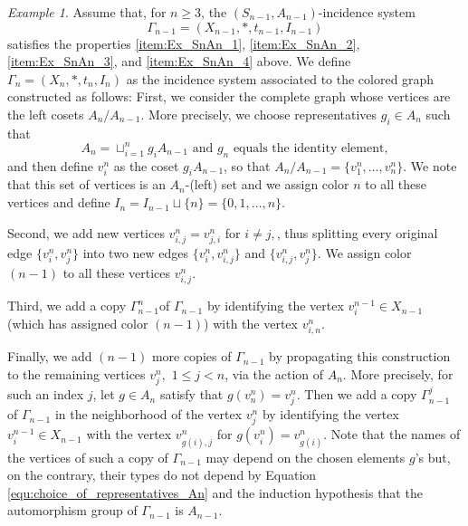 \documentclass{amsart}
\theoremstyle{definition}
\theoremstyle{remark}
\newtheorem{example}[theorem]{Example}
\begin{document}
\begin{example}
Assume that, for $n\geq 3$, the $(S_{n-1},A_{n-1})$-incidence system 
\[
\Gamma_{n-1}=(X_{n-1},*,t_{n-1},I_{n-1})
\]
satisfies the properties \ref{item:Ex_SnAn_1}, \ref{item:Ex_SnAn_2}, \ref{item:Ex_SnAn_3}, and \ref{item:Ex_SnAn_4} above. We define $\Gamma_n=(X_n,*,t_n,I_n)$ as the incidence system associated to the  colored graph constructed as follows: First, we consider the complete graph whose  vertices are the left cosets $A_n/A_{n-1}$. More precisely, we choose representatives $g_i\in A_n$ such that
\begin{equation}\label{equ:choice_of_representatives_An}
\text{$A_n=\sqcup_{i=1}^n g_iA_{n-1}$ and $g_n$ equals the identity element},
\end{equation}
and then define $v^n_i$ as the coset $g_iA_{n-1}$, so that $A_n/A_{n-1}=\{v^n_1,\ldots, v^n_n\}$. We note that this set of vertices is an $A_n$-(left) set and we assign color $n$ to all these vertices and define $I_n=I_{n-1}\sqcup\{n\}=\{0,1,\ldots,n\}$. 


Second, we add new vertices $v^n_{i,j}=v^n_{j,i}$ for $i\ne j,$, thus splitting every original edge $\{v^n_i,v^n_j\}$ into two new edges $\{v^n_i,v^n_{i,j}\}$ and $\{v^n_{i,j},v^n_j\}$. We assign color $(n-1)$ to all these vertices $v^n_{i,j}.$ 

Third, we add a copy $\Gamma^n_{n-1}$of $\Gamma_{n-1}$ by identifying the vertex $v^{n-1}_i\in X_{n-1}$ (which has assigned color $(n-1)$) with the vertex $v^n_{i,n}$.

Finally, we add $(n-1)$ more copies of $\Gamma_{n-1}$ by propagating this construction to the remaining vertices $v^n_j,$ $1\leq j<n$, via the action of $A_n$. More precisely, for such an index $j$, let $g\in A_n$ satisfy that $g(v^n_n)=v^n_j$. Then we add a copy $\Gamma^j_{n-1}$ of $\Gamma_{n-1}$ in the neighborhood of the vertex $v^n_j$ by identifying the vertex $v^{n-1}_i\in X_{n-1}$ with the vertex $v^n_{g(i),j}$ for $g(v^n_i)=v^n_{g(i)}$. Note that the names of the vertices of such a copy of $\Gamma_{n-1}$ may depend on the chosen elements $g$'s but, on the contrary, their types do not depend by Equation \eqref{equ:choice_of_representatives_An} and the induction hypothesis that the automorphism group of $\Gamma_{n-1}$ is $A_{n-1}$.


\end{example}
\end{document}
